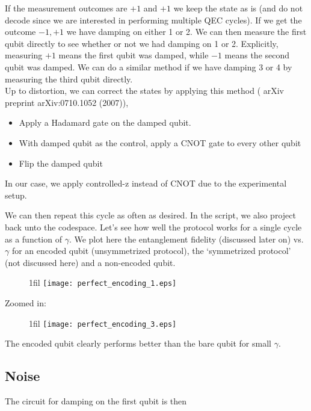 \documentclass[twoside]{article}
\makeatletter
\newcommand*{\centerfloat}{%
  \parindent \z@
  \leftskip \z@ \@plus 1fil \@minus \textwidth
  \rightskip\leftskip
  \parfillskip \z@skip}
\makeatother
\begin{document}
If the measurement outcomes are $+1$ and $+1$ we keep the state as is (and do not decode since we are interested in performing multiple QEC cycles). If we get the outcome $-1,+1$ we have damping on either 1 or 2. We can then measure the first qubit directly to see whether or not we had damping on 1 or 2. Explicitly, measuring $+1$ means the first qubit was damped, while $-1$ means the second qubit was damped. We can do a similar method if we have damping 3 or 4 by measuring the third qubit directly.\\

Up to distortion, we can correct the states by applying this method ( arXiv preprint arXiv:0710.1052 (2007)),
\begin{itemize}
\item   Apply a Hadamard gate on the damped qubit.
\item   With damped qubit as the control, apply a CNOT gate to every other qubit
\item   Flip the damped qubit
\end{itemize}
In our case, we apply controlled-z instead of CNOT due to the experimental setup.

We can then repeat this cycle as often as desired. In the script, we also project back unto the codespace. Let's see how well the protocol works for a single cycle as a function of $\gamma$. We plot here the entanglement fidelity (discussed later on) vs.~$\gamma$ for an encoded qubit (unsymmetrized protocol), the `symmetrized protocol' (not discussed here) and a non-encoded qubit.

\begin{figure}[H]
\centerfloat
\texttt{[image: perfect\_encoding\_1.eps]}
\end{figure}
Zoomed in:

\begin{figure}[H]
\centerfloat
\texttt{[image: perfect\_encoding\_3.eps]}
\end{figure}
The encoded qubit clearly performs better than the bare qubit for small $\gamma$.
\newpage
\subsection*{Noise}
The circuit for damping on the first qubit is then
\end{document}
